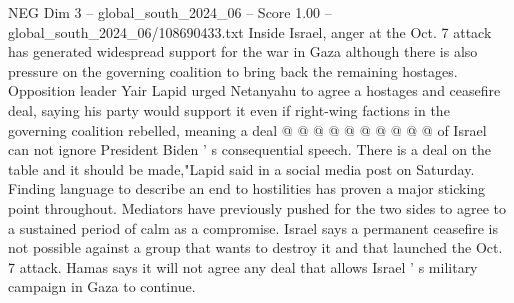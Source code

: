 \begin{textsample}{NEG Dim 3 – global\_south\_2024\_06 – Score 1.00 – global\_south\_2024\_06/108690433.txt}
Inside Israel, anger at the Oct. 7 attack has generated widespread support for the war in Gaza although there is also pressure on the governing coalition to bring back the remaining hostages.
Opposition leader Yair Lapid urged Netanyahu to agree a hostages and ceasefire deal, saying his party would support it even if right-wing factions in the governing coalition rebelled, meaning a deal @ @ @ @ @ @ @ @ @ @ of Israel can not ignore President Biden ' s consequential speech.
There is a deal on the table and it should be made,"Lapid said in a social media post on Saturday.
Finding language to describe an end to hostilities has proven a major sticking point throughout.
Mediators have previously pushed for the two sides to agree to a sustained period of calm as a compromise.
Israel says a permanent ceasefire is not possible against a group that wants to destroy it and that launched the Oct. 7 attack.
Hamas says it will not agree any deal that allows Israel ' s military campaign in Gaza to continue.

\end{textsample}
